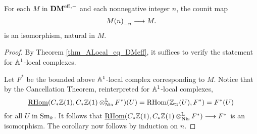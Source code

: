 \begin{cor}\label{cor_tZ_hZ_eq_id}
For each $M$ in $\DMeff$ and each nonnegative integer $n$, 
the counit map
\[
\hZ[n]{\tZ[n]{M}} \to M.
\]
is an isomorphism, natural in $M$.
\end{cor}
\begin{proof}
By Theorem \ref{thm_ALocal_eq_DMeff}, it suffices to verify the
statement for $\A^1$-local complexes. 

Let $F^*$ be the bounded above $\A^1$-local complex corresponding 
to $M$. Notice that by the Cancellation Theorem, reinterpreted for
$\A^1$-local complexes,
\[
\sheaf{\rhom}(\suslC \Z(1), \suslC \Z(1) \tLNis F^*)(U) = 
\rhom(\Ztr(U), F^*) = F^*(U)
\]
for all $U$ in $\Sm$. It follows that $\sheaf{\rhom}(\suslC\Z(1),
\suslC\Z(1) \tLNis F^*) \to F^*$ is an isomorphism. The
corollary now follows by induction on $n$.
\end{proof}
